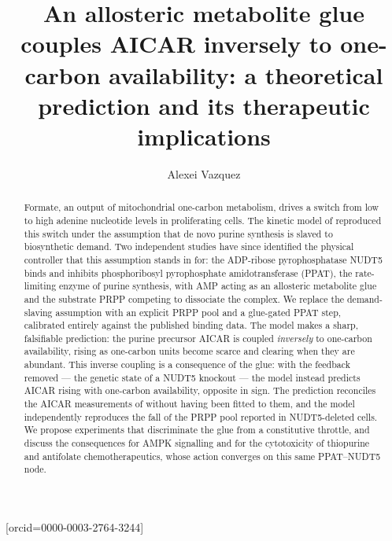 \documentclass[a4paper,fleqn]{cas-sc}
\begin{document}
\let\WriteBookmarks\relax
\def\floatpagepagefraction{1}
\def\textpagefraction{.001}

\shortauthors{}

\title[mode=title]{An allosteric metabolite glue couples AICAR inversely to
one-carbon availability: a theoretical prediction and its therapeutic implications}

\author[1]{Alexei Vazquez}[orcid=0000-0003-2764-3244]
\cormark[1]

\begin{abstract}
Formate, an output of mitochondrial one-carbon metabolism, drives a switch from
low to high adenine nucleotide levels in proliferating cells. The kinetic model
of \citet{oizel2020} reproduced this switch under the assumption that de novo
purine synthesis is slaved to biosynthetic demand. Two independent studies have
since identified the physical controller that this assumption stands in for: the
ADP-ribose pyrophosphatase NUDT5 binds and inhibits phosphoribosyl pyrophosphate
amidotransferase (PPAT), the rate-limiting enzyme of purine synthesis, with AMP
acting as an allosteric metabolite glue and the substrate PRPP competing to
dissociate the complex. We replace the demand-slaving assumption with an explicit
PRPP pool and a glue-gated PPAT step, calibrated entirely against the published
binding data. The model makes a sharp, falsifiable prediction: the purine
precursor AICAR is coupled \emph{inversely} to one-carbon availability, rising as
one-carbon units become scarce and clearing when they are abundant. This inverse
coupling is a consequence of the glue: with the feedback removed --- the genetic
state of a NUDT5 knockout --- the model instead predicts AICAR rising with
one-carbon availability, opposite in sign. The prediction reconciles the AICAR
measurements of \citet{oizel2020} without having been fitted to them, and the
model independently reproduces the fall of the PRPP pool reported in NUDT5-deleted
cells. We propose experiments that discriminate the glue from a constitutive
throttle, and discuss the consequences for AMPK signalling and for the
cytotoxicity of thiopurine and antifolate chemotherapeutics, whose action
converges on this same PPAT--NUDT5 node.
\end{abstract}
\end{document}
